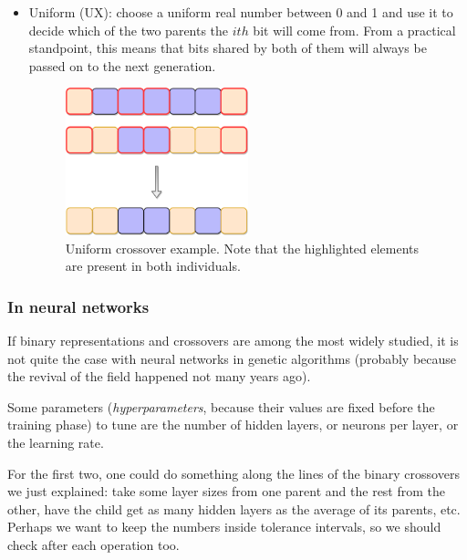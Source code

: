 \begin{itemize}
\begin{figure}[bth]
			    \end{figure}

			    \item
			    Uniform (UX): choose a uniform real number between 0 and 1 and use it to decide which of the two parents the $ith$ bit will come from. From a practical standpoint, this means that bits shared by both of them will always be passed on to the next generation.

			    \vspace{0.2cm}

			    \begin{figure}[bth]

			        \myfloatalign
			        \includegraphics[width=0.5\textwidth]{gfx/UniformCrossover.png}
			        \caption{Uniform crossover example. Note that the highlighted elements are present in both individuals.}

			    \end{figure}

			\end{itemize}

		\subsubsection{In neural networks}

			If binary representations and crossovers are among the most widely studied, it is not quite the case with neural networks in genetic algorithms (probably because the revival of the field happened not many years ago).

			Some parameters (\textit{hyperparameters}, because their values are fixed before the training phase) to tune are the number of hidden layers, or neurons per layer, or the learning rate.

			For the first two, one could do something along the lines of the binary crossovers we just explained: take some layer sizes from one parent and the rest from the other, have the child get as many hidden layers as the average of its parents, etc. Perhaps we want to keep the numbers inside tolerance intervals, so we should check after each operation too.

